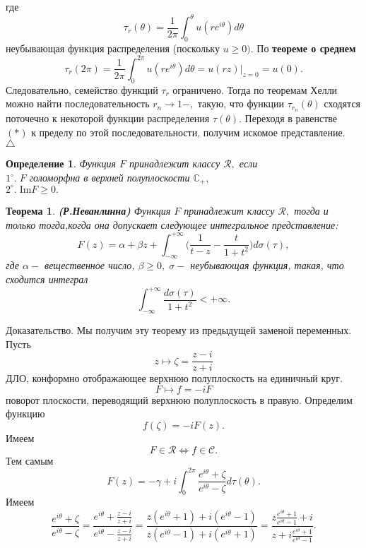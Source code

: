 \documentclass[12 pt, a4 paper]{article}
\theoremstyle{plain}   \newtheorem{Pro}{Задача}
\newtheorem{Def}{Определение}
\newtheorem{The}{Теорема}
\begin{document}
где
$$
  \tau _r (\theta )=\frac{1}{2\pi} \int _0 ^ {\theta}
  u(re^{i\theta})d\theta
$$
неубывающая функция распределения (поскольку
$ u \geq 0). $
По
{\bfseries теореме о среднем}
$$
  \tau _r (2\pi )=\frac{1}{2\pi} \int _0 ^{2\pi}
  u(re^{i\theta})d\theta =
  u(rz)|_{z=0} = u(0).
$$
Следовательно, семейство функций
$ \tau _r $
ограничено. Тогда по теоремам Хелли можно найти последовательность
$ r_n \rightarrow 1- , $
такую, что функции
$ \tau _{r_n}(\theta ) $
сходятся поточечно к некоторой функции распределения
$ \tau (\theta ) . $
Переходя в равенстве
$ (\ast ) $
к пределу по этой последовательности, получим искомое представление.
\\
$ \triangle $
\begin{Def}
Функция
$ F $
принадлежит классу
$ \mathcal{R} , $
если\\
$ 1^{\circ}. \; F $
голоморфна в верхней полуплоскости
$ \mathbb{C}_+ , $
\\
$ 2^{\circ}. \; \mathrm{Im} F \geq 0 . $
\end{Def}
\begin{The}
{\bfseries (Р.Неванлинна)}
Функция
$ F $
принадлежит классу
$ \mathcal{R} , $
тогда и только тогда,когда она допускает следующее
интегральное представление:
$$
  F(z)=\alpha +\beta z + \int _{-\infty}^{+\infty}
  \biggl( \frac{1}{t-z} - \frac{t}{1+t^2} \biggr )
  d \sigma (\tau ) ,
$$
где
$ \alpha - $
вещественное число,
$ \beta \geq 0, \; \sigma - $
неубывающая функция, такая, что сходится интеграл
$$
  \int _{-\infty}^{+\infty}
  \frac{d\sigma (\tau )}{1+t^2} < + \infty .
$$
\end{The}
{\Large Доказательство.}
Мы получим эту теорему из предыдущей заменой переменных.
Пусть
$$
  z \mapsto \zeta =\frac{z-i}{z+i}
$$
ДЛО, конформно отображающее верхнюю полуплоскость на
единичный круг.
$$
  F \mapsto f=-iF
$$
поворот плоскости, переводящий верхнюю полуплоскость в правую.
Определим функцию
$$
  f(\zeta )=-iF(z).
$$
Имеем
$$
  F \in \mathcal{R} \Longleftrightarrow  f \in \mathcal{C}.
$$
Тем самым
$$
  F(z)=-\gamma +i \int _0 ^{2\pi}
  \frac{e^{i\theta}+\zeta}{e^{i\theta}-\zeta}
  d\tau (\theta ).
$$
Имеем
$$
  \frac{e^{i\theta}+\zeta}{e^{i\theta}-\zeta}=
  \frac{e^{i\theta}+\frac{z-i}{z+i}}
  {e^{i\theta}-\frac{z-i}{z+i}}=
  \frac{z ( e^{i\theta}+1)+i(e^{i\theta}-1)}
  {z(e^{i\theta}-1)+i(e^{i\theta}+1)}=
  \frac{z\frac{e^{i\theta}+1}{e^{i\theta}-1}+i}
  {z+i\frac{e^{i\theta}+1}{e^{i\theta}-1}}.
$$
\end{document}

